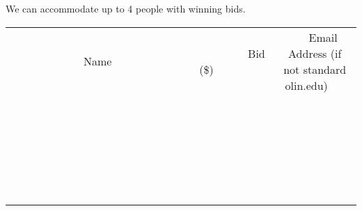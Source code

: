\documentclass[11pt]{article}
\begin{document}
We can accommodate up to 4 people with winning bids.
\\[6ex]
\begin{tabular}{c c c}
~~~~~~~~~~~~~Name~~~~~~~~~~~~~ & ~~~~~~~~~Bid (\$)~~~~~~~~~  & ~~~Email Address (if not standard olin.edu)~~~\\
 & & \\
\hline
 & & \\
\hline
 & & \\
\hline
 & & \\
\hline
 & & \\
\hline
 & & \\
\hline
 & & \\
\hline
 & & \\
\hline
 & & \\
\hline
 & & \\
\hline
 & & \\
\hline
 & & \\
\hline
 & & \\
\hline
 & & \\
\hline
 & & \\
\hline
 & & \\
\hline
 & & \\
\hline
 & & \\
\hline
 & & \\
\hline
 & & \\
\hline
 & & \\
\hline
 & & \\
\hline
 & & \\
\hline
 & & \\
\hline
 & & \\
\hline
 & & \\
\hline
\end{tabular}
\newpage
\end{document}
